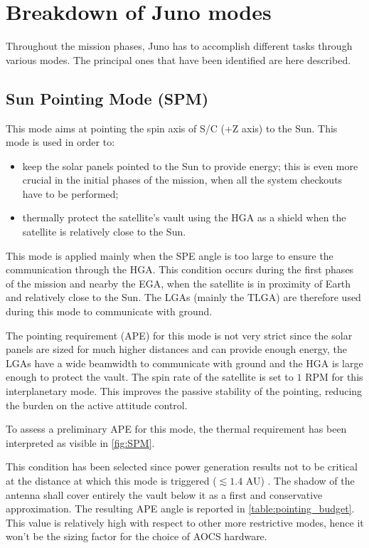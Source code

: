 \section{Breakdown of Juno modes}
\label{sec:AOCS_modes}

Throughout the mission phases, Juno has to accomplish different tasks through various modes. The principal ones that have been identified are here described.

\subsection{Sun Pointing Mode (SPM)}
\label{subsec:sun_pointing_mode}

This mode aims at pointing the spin axis of S/C (+Z axis) to the Sun. This mode is used in order to:
\begin{itemize}
    \item keep the solar panels pointed to the Sun to provide energy; this is even more crucial in the initial phases of the mission, when all the system checkouts have to be performed;
    \item thermally protect the satellite's vault using the HGA as a shield when the satellite is relatively close to the Sun.
\end{itemize}

This mode is applied mainly when the SPE angle is too large to ensure the communication through the HGA. This condition occurs during the first phases of the mission and nearby the EGA, when the satellite is in proximity of Earth and relatively close to the Sun. The LGAs (mainly the TLGA) are therefore used during this mode to communicate with ground.

The pointing requirement (APE) for this mode is not very strict since the solar panels are sized for much higher distances and can provide enough energy, the LGAs have a wide beamwidth to communicate with ground and the HGA is large enough to protect the vault.
The spin rate of the satellite is set to $1$ RPM for this interplanetary mode. This improves the passive stability of the pointing, reducing the burden on the active attitude control.

To assess a preliminary APE for this mode, the thermal requirement has been interpreted as visible in \autoref{fig:SPM}.

This condition has been selected since power generation results not to be critical at the distance at which this mode is triggered ($\lesssim 1.4$ AU) \cite{kurth}.
The shadow of the antenna shall cover entirely the vault below it as a first and conservative approximation.
The resulting APE angle is reported in \autoref{table:pointing_budget}.
This value is relatively high with respect to other more restrictive modes, hence it won't be the sizing factor for the choice of AOCS hardware.

